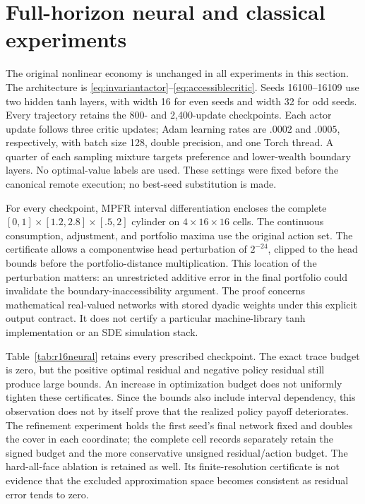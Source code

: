 \section{Full-horizon neural and classical experiments}\label{sec:r16neural}
The original nonlinear economy is unchanged in all experiments in this section. The architecture is \eqref{eq:invariantactor}--\eqref{eq:accessiblecritic}. Seeds 16100--16109 use two hidden tanh layers, with width 16 for even seeds and width 32 for odd seeds. Every trajectory retains the 800- and 2,400-update checkpoints. Each actor update follows three critic updates; Adam learning rates are $.0002$ and $.0005$, respectively, with batch size 128, double precision, and one Torch thread. A quarter of each sampling mixture targets preference and lower-wealth boundary layers. No optimal-value labels are used. These settings were fixed before the canonical remote execution; no best-seed substitution is made.

For every checkpoint, MPFR interval differentiation encloses the complete $[0,1]\times[1.2,2.8]\times[.5,2]$ cylinder on $4\times16\times16$ cells. The continuous consumption, adjustment, and portfolio maxima use the original action set. The certificate allows a componentwise head perturbation of $2^{-24}$, clipped to the head bounds before the portfolio-distance multiplication. This location of the perturbation matters: an unrestricted additive error in the final portfolio could invalidate the boundary-inaccessibility argument. The proof concerns mathematical real-valued networks with stored dyadic weights under this explicit output contract. It does not certify a particular machine-library tanh implementation or an SDE simulation stack.


Table~\ref{tab:r16neural} retains every prescribed checkpoint. The exact trace budget is zero, but the positive optimal residual and negative policy residual still produce large bounds. An increase in optimization budget does not uniformly tighten these certificates. Since the bounds also include interval dependency, this observation does not by itself prove that the realized policy payoff deteriorates. The refinement experiment holds the first seed's final network fixed and doubles the cover in each coordinate; the complete cell records separately retain the signed budget and the more conservative unsigned residual/action budget. The hard-all-face ablation is retained as well. Its finite-resolution certificate is not evidence that the excluded approximation space becomes consistent as residual error tends to zero.

